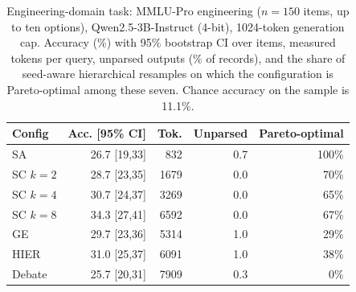 \begin{table}[t]\centering\footnotesize
\caption{Engineering-domain task: MMLU-Pro engineering ($n{=}150$ items, up to ten options), Qwen2.5-3B-Instruct (4-bit), 1024-token generation cap. Accuracy (\%) with 95\% bootstrap CI over items, measured tokens per query, unparsed outputs (\% of records), and the share of seed-aware hierarchical resamples on which the configuration is Pareto-optimal among these seven. Chance accuracy on the sample is 11.1\%.}
\label{tab:proeng}
\begin{tabular}{l r r r r}
\toprule
Config & Acc. [95\% CI] & Tok. & Unparsed & Pareto-optimal \\
\midrule
SA & 26.7 {\tiny[19,33]} & 832 & 0.7 & 100\% \\
SC $k{=}2$ & 28.7 {\tiny[23,35]} & 1679 & 0.0 & 70\% \\
SC $k{=}4$ & 30.7 {\tiny[24,37]} & 3269 & 0.0 & 65\% \\
SC $k{=}8$ & 34.3 {\tiny[27,41]} & 6592 & 0.0 & 67\% \\
GE & 29.7 {\tiny[23,36]} & 5314 & 1.0 & 29\% \\
HIER & 31.0 {\tiny[25,37]} & 6091 & 1.0 & 38\% \\
Debate & 25.7 {\tiny[20,31]} & 7909 & 0.3 & 0\% \\
\bottomrule
\end{tabular}
\end{table}
